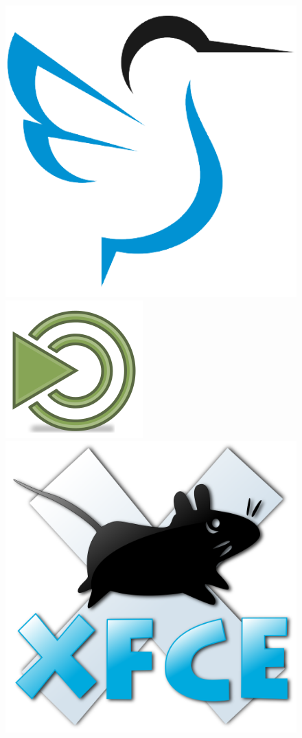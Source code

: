 \begin{figure}[ht!]
	\includegraphics[width=0.2\paperwidth]{./img/desktops/lxqt}
	\includegraphics[width=0.2\paperwidth]{./img/desktops/mate}
	\includegraphics[width=0.2\paperwidth]{./img/desktops/xfce}
\end{figure}


